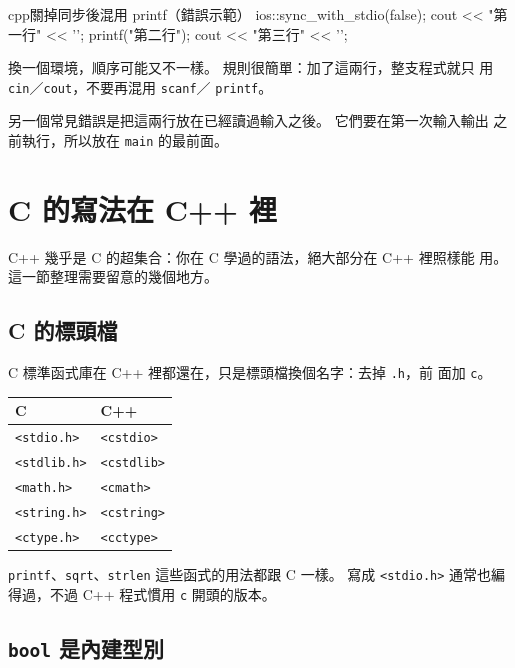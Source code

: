 \begin{code}{cpp}{關掉同步後混用 printf（錯誤示範）}
ios::sync_with_stdio(false);
cout << "第一行" << '\n';
printf("第二行\n");
cout << "第三行" << '\n';
\end{code}


換一個環境，順序可能又不一樣。 規則很簡單：加了這兩行，整支程式就只
用 \texttt{cin}／\texttt{cout}，不要再混用 \texttt{scanf}／
\texttt{printf}。

另一個常見錯誤是把這兩行放在已經讀過輸入之後。 它們要在第一次輸入輸出
之前執行，所以放在 \texttt{main} 的最前面。

\section{C 的寫法在 C++ 裡}
\label{sec:c-in-cpp}

C++ 幾乎是 C 的超集合：你在 C 學過的語法，絕大部分在 C++ 裡照樣能
用。 這一節整理需要留意的幾個地方。

\subsection{C 的標頭檔}

C 標準函式庫在 C++ 裡都還在，只是標頭檔換個名字：去掉 \texttt{.h}，前
面加 \texttt{c}。

\begin{center}
\begin{tabular}{ll}
\toprule
C & C++ \\
\midrule
\texttt{<stdio.h>} & \texttt{<cstdio>} \\
\texttt{<stdlib.h>} & \texttt{<cstdlib>} \\
\texttt{<math.h>} & \texttt{<cmath>} \\
\texttt{<string.h>} & \texttt{<cstring>} \\
\texttt{<ctype.h>} & \texttt{<cctype>} \\
\bottomrule
\end{tabular}
\end{center}

\texttt{printf}、\texttt{sqrt}、\texttt{strlen} 這些函式的用法都跟 C
一樣。 寫成 \texttt{<stdio.h>} 通常也編得過，不過 C++ 程式慣用
\texttt{c} 開頭的版本。

\subsection{\texttt{bool} 是內建型別}


